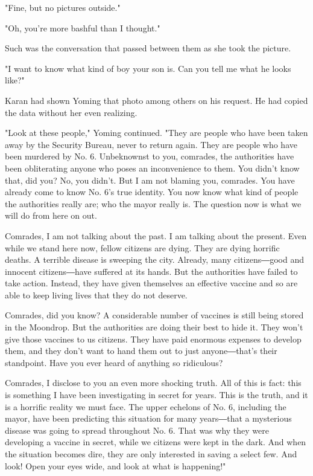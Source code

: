 "Fine, but no pictures outside."

"Oh, you're more bashful than I thought."

Such was the conversation that passed between them as she took the
picture.

"I want to know what kind of boy your son is. Can you tell me what he
looks like?"

Karan had shown Yoming that photo among others on his request. He had
copied the data without her even realizing.

"Look at these people," Yoming continued. "They are people who have been
taken away by the Security Bureau, never to return again. They are
people who have been murdered by No. 6. Unbeknownst to you, comrades,
the authorities have been obliterating anyone who poses an inconvenience
to them. You didn't know that, did you? No, you didn't. But I am not
blaming you, comrades. You have already come to know No. 6's true
identity. You now know what kind of people the authorities really are;
who the mayor really is. The question now is what we will do from here
on out.

Comrades, I am not talking about the past. I am talking about the
present. Even while we stand here now, fellow citizens are dying. They
are dying horrific deaths. A terrible disease is sweeping the city.
Already, many citizens―good and innocent citizens―have suffered at its
hands. But the authorities have failed to take action. Instead, they
have given themselves an effective vaccine and so are able to keep
living lives that they do not deserve.

Comrades, did you know? A considerable number of vaccines is still being
stored in the Moondrop. But the authorities are doing their best to hide
it. They won't give those vaccines to us citizens. They have paid
enormous expenses to develop them, and they don't want to hand them out
to just anyone―that's their standpoint. Have you ever heard of anything
so ridiculous?

Comrades, I disclose to you an even more shocking truth. All of this is
fact: this is something I have been investigating in secret for years.
This is the truth, and it is a horrific reality we must face. The upper
echelons of No. 6, including the mayor, have been predicting this
situation for many years―that a mysterious disease was going to spread
throughout No. 6. That was why they were developing a vaccine in secret,
while we citizens were kept in the dark. And when the situation becomes
dire, they are only interested in saving a select few. And look! Open
your eyes wide, and look at what is happening!"

